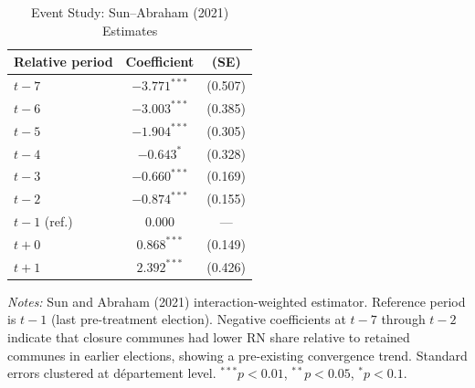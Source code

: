 \begin{table}[htbp]
\centering
\caption{Event Study: Sun--Abraham (2021) Estimates}
\label{tab:eventstudy}
\begin{tabular}{lcc}
\toprule
Relative period & Coefficient & (SE) \\
\midrule
$t-7$ & $-3.771^{***}$ & (0.507) \\
$t-6$ & $-3.003^{***}$ & (0.385) \\
$t-5$ & $-1.904^{***}$ & (0.305) \\
$t-4$ & $-0.643^{*}$ & (0.328) \\
$t-3$ & $-0.660^{***}$ & (0.169) \\
$t-2$ & $-0.874^{***}$ & (0.155) \\
$t-1$ (ref.) & $0.000$ & --- \\
$t+0$ & $0.868^{***}$ & (0.149) \\
$t+1$ & $2.392^{***}$ & (0.426) \\
\bottomrule
\end{tabular}
\begin{tablenotes}[flushleft]
\small
\item \textit{Notes:} Sun and Abraham (2021) interaction-weighted estimator. Reference period is $t-1$ (last pre-treatment election). Negative coefficients at $t-7$ through $t-2$ indicate that closure communes had lower RN share relative to retained communes in earlier elections, showing a pre-existing convergence trend. Standard errors clustered at d\'epartement level. $^{***}p<0.01$, $^{**}p<0.05$, $^{*}p<0.1$.
\end{tablenotes}
\end{table}

